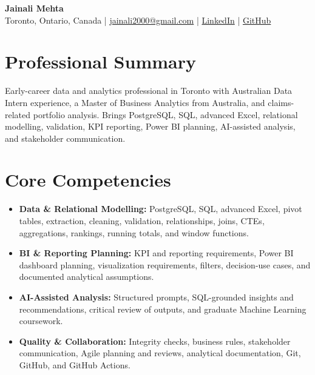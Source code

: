 \documentclass[letterpaper,10pt]{article}
\begin{document}
\begin{center}
  {\fontsize{17}{19}\selectfont\textbf{Jainali Mehta}}\\[2pt]
  \small Toronto, Ontario, Canada \;|\;
  \href{mailto:jainali2000@gmail.com}{jainali2000@gmail.com} \;|\;
  \href{https://www.linkedin.com/in/jainali-mehta}{LinkedIn} \;|\;
  \href{https://github.com/jainalimehta}{GitHub}
\end{center}
\vspace{-7pt}

\section{Professional Summary}
\small Early-career data and analytics professional in Toronto with Australian Data Intern experience, a Master of Business Analytics from Australia, and claims-related portfolio analysis. Brings PostgreSQL, SQL, advanced Excel, relational modelling, validation, KPI reporting, Power BI planning, AI-assisted analysis, and stakeholder communication.

\section{Core Competencies}
\begin{itemize}[leftmargin=0.16in,label=\textbullet,topsep=0pt,itemsep=1pt,parsep=0pt]
  \item \small \textbf{Data \& Relational Modelling:} PostgreSQL, SQL, advanced Excel, pivot tables, extraction, cleaning, validation, relationships, joins, CTEs, aggregations, rankings, running totals, and window functions.
  \item \small \textbf{BI \& Reporting Planning:} KPI and reporting requirements, Power BI dashboard planning, visualization requirements, filters, decision-use cases, and documented analytical assumptions.
  \item \small \textbf{AI-Assisted Analysis:} Structured prompts, SQL-grounded insights and recommendations, critical review of outputs, and graduate Machine Learning coursework.
  \item \small \textbf{Quality \& Collaboration:} Integrity checks, business rules, stakeholder communication, Agile planning and reviews, analytical documentation, Git, GitHub, and GitHub Actions.
\end{itemize}
\end{document}
